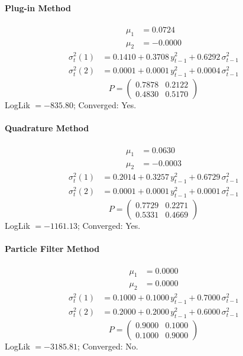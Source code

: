 \documentclass[11pt, a4paper]{article}
\begin{document}
\paragraph{Plug-in Method}
\begin{align}
\mu_{1} &= 0.0724 \\
\mu_{2} &= -0.0000
\end{align}
\begin{align}
\sigma^2_{t}(1) &= 0.1410 + 0.3708\, y_{t-1}^2 + 0.6292\, \sigma^2_{t-1} \\
\sigma^2_{t}(2) &= 0.0001 + 0.0001\, y_{t-1}^2 + 0.0004\, \sigma^2_{t-1}
\end{align}
\begin{equation}
P = \begin{pmatrix} 0.7878 & 0.2122 \\ 0.4830 & 0.5170 \end{pmatrix}
\end{equation}
LogLik $= -835.80$; Converged: Yes.

\paragraph{Quadrature Method}
\begin{align}
\mu_{1} &= 0.0630 \\
\mu_{2} &= -0.0003
\end{align}
\begin{align}
\sigma^2_{t}(1) &= 0.2014 + 0.3257\, y_{t-1}^2 + 0.6729\, \sigma^2_{t-1} \\
\sigma^2_{t}(2) &= 0.0001 + 0.0001\, y_{t-1}^2 + 0.0001\, \sigma^2_{t-1}
\end{align}
\begin{equation}
P = \begin{pmatrix} 0.7729 & 0.2271 \\ 0.5331 & 0.4669 \end{pmatrix}
\end{equation}
LogLik $= -1161.13$; Converged: Yes.

\paragraph{Particle Filter Method}
\begin{align}
\mu_{1} &= 0.0000 \\
\mu_{2} &= 0.0000
\end{align}
\begin{align}
\sigma^2_{t}(1) &= 0.1000 + 0.1000\, y_{t-1}^2 + 0.7000\, \sigma^2_{t-1} \\
\sigma^2_{t}(2) &= 0.2000 + 0.2000\, y_{t-1}^2 + 0.6000\, \sigma^2_{t-1}
\end{align}
\begin{equation}
P = \begin{pmatrix} 0.9000 & 0.1000 \\ 0.1000 & 0.9000 \end{pmatrix}
\end{equation}
LogLik $= -3185.81$; Converged: No.
\end{document}

